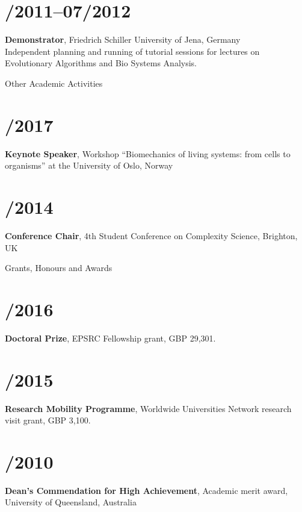 \documentclass[margin,line,10pt]{res}
\begin{document}
\begin{resume}
\section{/2011--07/2012}{\bf Demonstrator}, Friedrich Schiller University of Jena, Germany\\
Independent planning and running of tutorial sessions for lectures on Evolutionary Algorithms and Bio Systems Analysis.\\

\vspace*{-.2in}

{\sc Other Academic Activities}\\
\vspace*{-.35in}
\section{/2017}{\bf Keynote Speaker}, Workshop ``Biomechanics of living systems: from cells to organisms'' at the University of Oslo, Norway\\
\vspace*{-.35in}
\section{/2014}{\bf Conference Chair}, 4th Student Conference on Complexity Science, Brighton, UK\\

\vspace*{-.2in}

{\sc Grants, Honours and Awards}\\
\vspace*{-.35in}
\section{/2016}{\bf Doctoral Prize}, EPSRC Fellowship grant, GBP 29,301.\\
\vspace*{-.35in}
\section{/2015}{\bf Research Mobility Programme}, Worldwide Universities Network research visit grant, GBP 3,100.\\        
\vspace*{-.35in}
\section{/2010}{\bf Dean's Commendation for High Achievement}, Academic merit award, University of Queensland, Australia\\
\vspace*{-.35in}

\end{resume}
\end{document}
